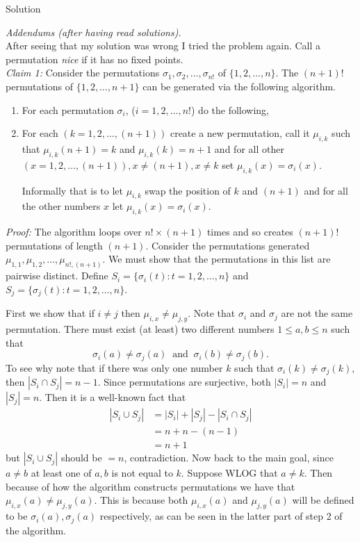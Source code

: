 \documentclass{article}
\begin{document}
\begin{solution}{Solution}
{\color{gray} \hline}
\vspace{0.2cm}

\textit{Addendums (after having read solutions).}\\

After seeing that my solution was wrong I tried the problem again.
Call a permutation \textit{nice} if it has no fixed points. \\

\textit{Claim 1:} Consider the permutations $\sigma_1, \sigma_2, \ldots,
\sigma_{n!}$ of $\{1,2,\ldots,n\}$. The $(n+1)!$ permutations of
$\{1,2,\ldots, n+1\}$ can be generated via the following algorithm.

\begin{enumerate}
\item For each permutation $\sigma_i$, ($i=1,2,\ldots, n!$) do the
following,
\item For each $(k=1,2,\ldots, (n+1))$ create a new permutation,
call it $\mu_{i,k}$ such that $\mu_{i,k}(n+1) = k$ and
$\mu_{i,k}(k) = n+1$ and for all other
$(x=1,2,\ldots,(n+1)), x \neq (n+1), x\neq k$
set $\mu_{i,k}(x) = \sigma_{i}(x)$. \vspace{0.2cm}

Informally that is to let $\mu_{i,k}$ swap
the position of $k$ and $(n+1)$ and for all the other numbers $x$ let
$\mu_{i,k}(x) = \sigma_i(x)$.
\end{enumerate}

\textit{Proof:} The algorithm loops over $n! \times (n+1)$ times and so
creates $(n+1)!$ permutations of length $(n+1)$. Consider the permutations
generated $\mu_{1,1}, \mu_{1,2}, \ldots, \mu_{n!, (n+1)}$. We must show that
the permutations in this list are pairwise distinct.
Define
$S_i = \{ \sigma_i(t) : t=1,2,\ldots,n \}$ and
$S_j = \{ \sigma_j(t) : t=1,2,\ldots,n \}$. \vspace{0.2cm}

First we show that if $i \neq j$ then $\mu_{i,x} \neq \mu_{j,y}$.
Note that $\sigma_i$ and $\sigma_j$ are not the same permutation.
There must exist (at least) two different numbers $1\leq a,b\leq n$ such that
$$
\sigma_i(a) \neq \sigma_j(a) \ \text{ and } \ \sigma_i(b) \neq \sigma_j(b).
$$
To see why note that if
there was only one number $k$ such that $\sigma_i(k) \neq \sigma_j(k)$,
then $| S_i \cap S_j | = n-1$.
Since permutations are surjective, both $|S_i| = n$ and $ |S_j| = n$. Then
it is a well-known fact that
\[
\begin{aligned}
|S_i \cup S_j| &= |S_i| + |S_j| - |S_i \cap S_j| \\
&= n + n - (n-1)\\
&= n+1
\end{aligned}
\]
but $|S_i \cup S_j|$ should be $=n$, contradiction. Now back to the main
goal, since $a \neq b$ at least one of $a,b$ is not equal to $k$. Suppose
WLOG that $a \neq k$. Then because of how the algorithm constructs
permutations we have that $\mu_{i,x}(a) \neq \mu_{j,y}(a)$. This is because
both $\mu_{i,x}(a)$ and $\mu_{j,y}(a)$ will be defined to be
$\sigma_i(a),  \sigma_j(a)$ respectively, as can be seen in the latter part
of step 2 of the algorithm.\vspace{0.2cm}


\end{solution}
\end{document}
